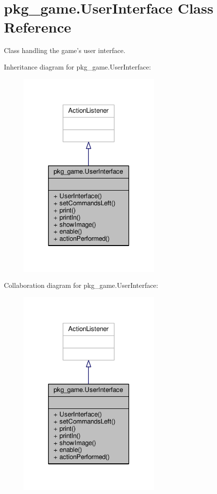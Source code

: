 \hypertarget{classpkg__game_1_1UserInterface}{\section{pkg\-\_\-game.\-User\-Interface Class Reference}
\label{classpkg__game_1_1UserInterface}
}


Class handling the game's user interface.  




Inheritance diagram for pkg\-\_\-game.\-User\-Interface\-:\nopagebreak
\begin{figure}[H]
\begin{center}
\leavevmode
\includegraphics[width=202pt]{classpkg__game_1_1UserInterface__inherit__graph}
\end{center}
\end{figure}


Collaboration diagram for pkg\-\_\-game.\-User\-Interface\-:\nopagebreak
\begin{figure}[H]
\begin{center}
\leavevmode
\includegraphics[width=202pt]{classpkg__game_1_1UserInterface__coll__graph}
\end{center}
\end{figure}
